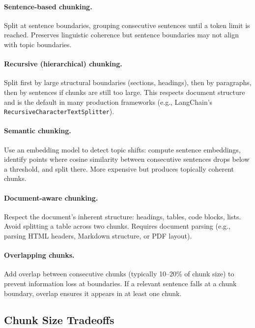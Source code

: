 \paragraph{Sentence-based chunking.}
Split at sentence boundaries, grouping consecutive sentences until a token
limit is reached.  Preserves linguistic coherence but sentence boundaries may
not align with topic boundaries.

\paragraph{Recursive (hierarchical) chunking.}
Split first by large structural boundaries (sections, headings), then by
paragraphs, then by sentences if chunks are still too large.  This respects
document structure and is the default in many production frameworks
(e.g., LangChain's \texttt{RecursiveCharacterTextSplitter}).

\paragraph{Semantic chunking.}
Use an embedding model to detect topic shifts: compute sentence embeddings,
identify points where cosine similarity between consecutive sentences drops
below a threshold, and split there.  More expensive but produces topically
coherent chunks.

\paragraph{Document-aware chunking.}
Respect the document's inherent structure: headings, tables, code blocks,
lists.  Avoid splitting a table across two chunks.  Requires document parsing
(e.g., parsing HTML headers, Markdown structure, or PDF layout).

\paragraph{Overlapping chunks.}
Add overlap between consecutive chunks (typically 10--20\% of chunk size)
to prevent information loss at boundaries.  If a relevant sentence falls
at a chunk boundary, overlap ensures it appears in at least one chunk.

\subsection{Chunk Size Tradeoffs}

